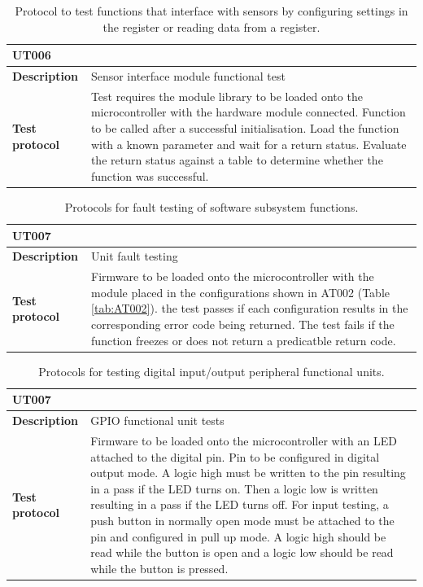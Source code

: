 \begin{table}[H]
	\centering
	\caption{ Protocol to test functions that interface with sensors by configuring settings in the register or reading data from a register.}
	\label{tab:UT006}
	\setlength{\extrarowheight}{5pt}
	\begin{tabular}{m{} m{}}
		\multicolumn{2}{l}{\textbf{UT006} }\\
		\hline
		\textbf{Description} & Sensor interface module functional test\\
		\hline
		\hline
		\textbf{Test protocol} & Test requires the module library to be loaded onto the microcontroller with the hardware module connected. Function to be called after a successful initialisation. Load the function with a known parameter and wait for a return status. Evaluate the return status against a table to determine whether the function was successful. \\
		\hline
		\hline
	\end{tabular}
\end{table}

\begin{table}[H]
	\centering
	\setlength{\extrarowheight}{5pt}
	\caption{ Protocols for fault testing of software subsystem functions.}
	\label{tab:UT007}
	\begin{tabular}{m{} m{}}
		\multicolumn{2}{l}{\textbf{UT007} }\\
		\hline
		\textbf{Description} & Unit fault testing\\
		\hline
		\hline
		\textbf{Test protocol} & Firmware to be loaded onto the microcontroller with the module placed in the configurations shown in AT002 (Table \ref{tab:AT002}). the test passes if each configuration results in the corresponding error code being returned. The test fails if the function freezes or does not return a predicatble return code.  \\
		\hline
		\hline
	\end{tabular}
\end{table}

\begin{table}[H]
	\centering
	\setlength{\extrarowheight}{5pt}
	\caption{ Protocols for testing digital input/output peripheral functional units.}
	\label{tab:UT008}
	\begin{tabular}{m{} m{}}
		\multicolumn{2}{l}{\textbf{UT007} }\\
		\hline
		\textbf{Description} & GPIO functional unit tests\\
		\hline
		\hline
		\textbf{Test protocol} & Firmware to be loaded onto the microcontroller with an LED attached to the digital pin. Pin to be configured in digital output mode. A logic high must be written to the pin resulting in a pass if the LED turns on. Then a logic low is written resulting in a pass if the LED turns off. For input testing, a push button in normally open mode must be attached to the pin and configured in pull up mode. A logic high should be read while the button is open and a logic low should be read while the button is pressed. \\
		\hline
		\hline
	\end{tabular}
\end{table}
